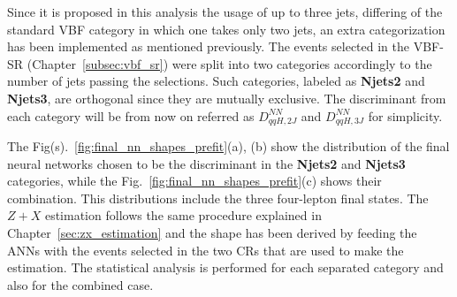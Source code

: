 Since it is proposed in this analysis the usage of up to three jets, differing of the standard VBF category in which one takes only two jets, an extra categorization has been implemented as mentioned previously. The events selected in the VBF-SR (Chapter~\ref{subsec:vbf_sr}) were split into two categories accordingly to the number of jets passing the selections. Such categories, labeled as \textbf{Njets2} and \textbf{Njets3}, are orthogonal since they are mutually exclusive. The discriminant from each category will be from now on referred as $D_{qqH,2J}^{NN}$ and $D_{qqH,3J}^{NN}$ for simplicity.

The Fig(s).~\ref{fig:final_nn_shapes_prefit}(a), (b) show the distribution of the final neural networks chosen to be the discriminant in the \textbf{Njets2} and \textbf{Njets3} categories, while the Fig.~\ref{fig:final_nn_shapes_prefit}(c) shows their combination. This distributions include the three four-lepton final states. The $Z+X$ estimation follows the same procedure explained in Chapter~\ref{sec:zx_estimation} and the shape has been derived by feeding the ANNs with the events selected in the two CRs that are used to make the estimation. The statistical analysis is performed for each separated category and also for the combined case.

